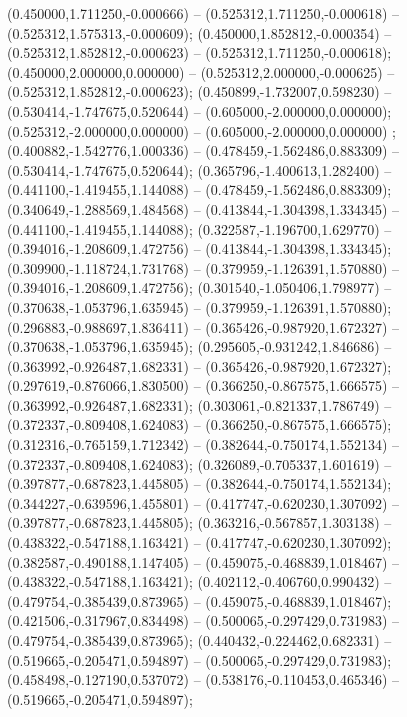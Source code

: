  (0.450000,1.711250,-0.000666) -- (0.525312,1.711250,-0.000618) -- (0.525312,1.575313,-0.000609);
 (0.450000,1.852812,-0.000354) -- (0.525312,1.852812,-0.000623) -- (0.525312,1.711250,-0.000618);
 (0.450000,2.000000,0.000000) -- (0.525312,2.000000,-0.000625) -- (0.525312,1.852812,-0.000623);
 (0.450899,-1.732007,0.598230) -- (0.530414,-1.747675,0.520644) -- (0.605000,-2.000000,0.000000);
 (0.525312,-2.000000,0.000000) -- (0.605000,-2.000000,0.000000) ;
 (0.400882,-1.542776,1.000336) -- (0.478459,-1.562486,0.883309) -- (0.530414,-1.747675,0.520644);
 (0.365796,-1.400613,1.282400) -- (0.441100,-1.419455,1.144088) -- (0.478459,-1.562486,0.883309);
 (0.340649,-1.288569,1.484568) -- (0.413844,-1.304398,1.334345) -- (0.441100,-1.419455,1.144088);
 (0.322587,-1.196700,1.629770) -- (0.394016,-1.208609,1.472756) -- (0.413844,-1.304398,1.334345);
 (0.309900,-1.118724,1.731768) -- (0.379959,-1.126391,1.570880) -- (0.394016,-1.208609,1.472756);
 (0.301540,-1.050406,1.798977) -- (0.370638,-1.053796,1.635945) -- (0.379959,-1.126391,1.570880);
 (0.296883,-0.988697,1.836411) -- (0.365426,-0.987920,1.672327) -- (0.370638,-1.053796,1.635945);
 (0.295605,-0.931242,1.846686) -- (0.363992,-0.926487,1.682331) -- (0.365426,-0.987920,1.672327);
 (0.297619,-0.876066,1.830500) -- (0.366250,-0.867575,1.666575) -- (0.363992,-0.926487,1.682331);
 (0.303061,-0.821337,1.786749) -- (0.372337,-0.809408,1.624083) -- (0.366250,-0.867575,1.666575);
 (0.312316,-0.765159,1.712342) -- (0.382644,-0.750174,1.552134) -- (0.372337,-0.809408,1.624083);
 (0.326089,-0.705337,1.601619) -- (0.397877,-0.687823,1.445805) -- (0.382644,-0.750174,1.552134);
 (0.344227,-0.639596,1.455801) -- (0.417747,-0.620230,1.307092) -- (0.397877,-0.687823,1.445805);
 (0.363216,-0.567857,1.303138) -- (0.438322,-0.547188,1.163421) -- (0.417747,-0.620230,1.307092);
 (0.382587,-0.490188,1.147405) -- (0.459075,-0.468839,1.018467) -- (0.438322,-0.547188,1.163421);
 (0.402112,-0.406760,0.990432) -- (0.479754,-0.385439,0.873965) -- (0.459075,-0.468839,1.018467);
 (0.421506,-0.317967,0.834498) -- (0.500065,-0.297429,0.731983) -- (0.479754,-0.385439,0.873965);
 (0.440432,-0.224462,0.682331) -- (0.519665,-0.205471,0.594897) -- (0.500065,-0.297429,0.731983);
 (0.458498,-0.127190,0.537072) -- (0.538176,-0.110453,0.465346) -- (0.519665,-0.205471,0.594897);
